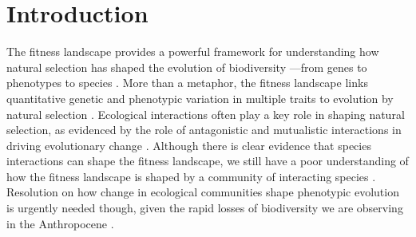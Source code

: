 \documentclass[11pt,]{article}
\begin{document}
\newpage

\section{Introduction}\label{introduction}

The fitness landscape provides a powerful framework for understanding
how natural selection has shaped the evolution of biodiversity ---from
genes to phenotypes to species
\citep{Wright1931, Simpson1944, Arnold2001}. More than a metaphor, the
fitness landscape links quantitative genetic and phenotypic variation in
multiple traits to evolution by natural selection
\citep{Lande1979, Arnold1984applications, Arnold1984theory}. Ecological
interactions often play a key role in shaping natural selection, as
evidenced by the role of antagonistic and mutualistic interactions in
driving evolutionary change
\citep{Schluter2000, Abrams2000, Bronstein2006}. Although there is clear
evidence that species interactions can shape the fitness landscape, we
still have a poor understanding of how the fitness landscape is shaped
by a community of interacting species
\citep{McPeek2017, terHorst2018, Hui2018}. Resolution on how change in
ecological communities shape phenotypic evolution is urgently needed
though, given the rapid losses of biodiversity we are observing in the
Anthropocene \citep{Scheffers2016}.
\end{document}
